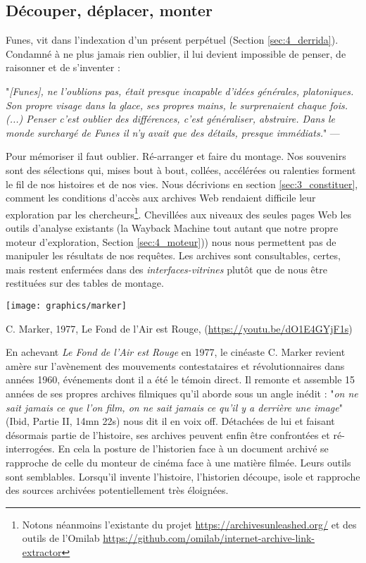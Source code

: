 \documentclass[symmetric,justified,marginals=raggedouter]{tufte-book}
\begin{document}
\subsection{Découper, déplacer, monter}

\noindent Funes, vit dans l'indexation d'un présent perpétuel (Section \ref{sec:4_derrida}). Condamné à ne plus jamais rien oublier, il lui devient impossible de penser, de raisonner et de s'inventer :

\begin{fullwidth}
"\textit{[Funes], ne l’oublions pas, était presque incapable d’idées générales, platoniques. Son propre visage dans la glace, ses propres mains, le surprenaient chaque fois. (...) Penser c'est oublier des différences, c'est généraliser, abstraire. Dans le monde surchargé de Funes il n'y avait que des détails, presque immédiats.}" --- \citep[p.~117-118]{borges_fictions_1974}\\
\end{fullwidth} 

\noindent Pour mémoriser il faut oublier. Ré-arranger et faire du montage. Nos souvenirs sont des sélections qui, mises bout à bout, collées, accélérées ou ralenties forment le fil de nos histoires et de nos vies. Nous décrivions en section \ref{sec:3_constituer}, comment les conditions d'accès aux archives Web rendaient difficile leur exploration par les chercheurs\footnote{Notons  néanmoins l'existante du projet \url{https://archivesunleashed.org/} et des outils de l'Omilab \url{https://github.com/omilab/internet-archive-link-extractor}}. Chevillées aux niveaux des seules pages Web les outils d'analyse existants (la Wayback Machine tout autant que notre propre moteur d'exploration, Section \ref{sec:4_moteur})) nous nous permettent pas de manipuler les résultats de nos requêtes. Les archives sont consultables, certes, mais restent enfermées dans des \textit{interfaces-vitrines} plutôt que de nous être restituées sur des tables de montage. 

\begin{marginfigure}%
  \texttt{[image: graphics/marker]}
  \caption{C. Marker, 1977, Le Fond de l'Air est Rouge, (\url{https://youtu.be/dO1E4GYjF1s})}
  \label{fig:marker}
\end{marginfigure}

En achevant \textit{Le Fond de l'Air est Rouge} en 1977, le cinéaste C. Marker revient amère sur l'avènement des mouvements contestataires et révolutionnaires dans années 1960, événements dont il a été le témoin direct. Il remonte et assemble 15 années de ses propres archives filmiques qu'il aborde sous un angle inédit : "\textit{on ne sait jamais ce que l'on film, on ne sait jamais ce qu'il y a derrière une image}" (Ibid, Partie II, 14mn 22s) nous dit il en voix off. Détachées de lui et faisant désormais partie de l'histoire, ses archives peuvent enfin être confrontées et ré-interrogées. En cela la posture de l'historien face à un document archivé se rapproche de celle du monteur de cinéma face à une matière filmée. Leurs outils sont semblables. Lorsqu'il invente l'histoire, l'historien découpe, isole et rapproche des sources archivées potentiellement très éloignées. 
\end{document}
